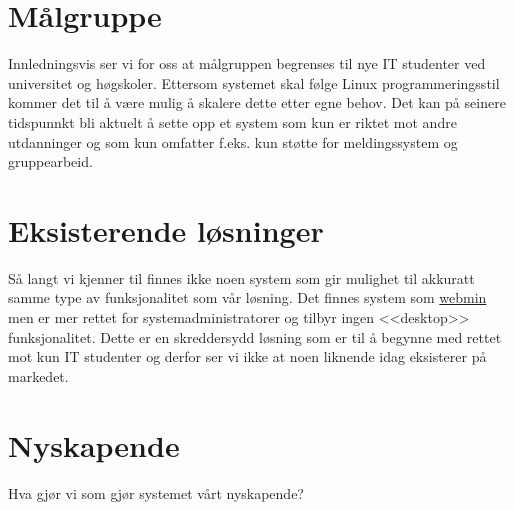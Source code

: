 \section{Målgruppe} \label{sec:målgruppe}
Innledningsvis ser vi for oss at målgruppen begrenses til nye IT studenter ved universitet og høgskoler. Ettersom systemet skal følge Linux programmeringsstil\cite{book:unixprog} kommer det til å være mulig å skalere dette etter egne behov. Det kan på seinere tidspunnkt bli aktuelt å sette opp et system som kun er riktet mot andre utdanninger og som kun omfatter f.eks. kun støtte for meldingssystem og gruppearbeid.

\section{Eksisterende løsninger}
Så langt vi kjenner til finnes ikke noen system som gir mulighet til akkuratt samme type av funksjonalitet som vår løsning. Det finnes system som \href{http://en.wikipedia.org/wiki/Webmin}{webmin} men er mer rettet for systemadministratorer og tilbyr ingen <<desktop>> funksjonalitet. Dette er en skreddersydd løsning som er til å begynne med rettet mot kun IT studenter og derfor ser vi ikke at noen liknende idag eksisterer på markedet. 

\section{Nyskapende}
Hva gjør vi som gjør systemet vårt nyskapende?